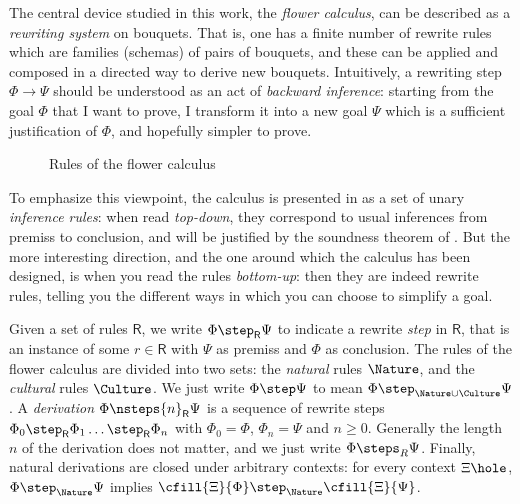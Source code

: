 The central device studied in this work, the \emph{flower calculus}, can be
described as a \emph{rewriting system} on bouquets. That is, one has a finite
number of rewrite rules which are families (schemas) of pairs of bouquets, and
these can be applied and composed in a directed way to derive new bouquets.
Intuitively, a rewriting step $\Phi \rightarrow \Psi$ should be understood as an
act of \emph{backward inference}: starting from the goal $\Phi$ that I want to
prove, I transform it into a new goal $\Psi$ which is a sufficient justification
of $\Phi$, and hopefully simpler to prove.

\begin{figure*}
  
  \caption{Rules of the flower calculus}
\end{figure*}


To emphasize this viewpoint, the calculus is presented in
 as a set of unary \emph{inference rules}: when read
\emph{top-down}, they correspond to usual inferences from premiss to conclusion,
and will be justified by the soundness theorem of .
But the more interesting direction, and the one around which the calculus has
been designed, is when you read the rules \emph{bottom-up}: then they are indeed
rewrite rules, telling you the different ways in which you can choose to
simplify a goal.


\begin{definition}[Derivation]
  Given a set of rules $\mathsf{R}$, we write $\Phi \step_{\mathsf{R}} \Psi$ to
  indicate a rewrite \emph{step} in $\mathsf{R}$, that is an instance of some
  $r \in \mathsf{R}$ with $\Psi$ as premiss and $\Phi$ as conclusion.
  The rules of the flower calculus are divided into two sets: the \emph{natural}
  rules $\Nature$, and the \emph{cultural} rules $\Culture$. We just write $\Phi
  \step \Psi$ to mean $\Phi \step_{\Nature\cup\Culture} \Psi$. A
  \emph{derivation} $\Phi \nsteps{n}_{\mathsf{R}} \Psi$ is a sequence of rewrite
  steps $\Phi_0 \step_{\mathsf{R}} \Phi_1 \ldots \step_{\mathsf{R}} \Phi_n$ with
  $\Phi_0 = \Phi$, $\Phi_n = \Psi$ and $n \geq 0$. Generally the length $n$ of
  the derivation does not matter, and we just write $\Phi \steps_R \Psi$.
  Finally, natural derivations are closed under arbitrary contexts: for every
  context $\Xi\hole$, $\Phi \step_\Nature \Psi$ implies $\cfill{\Xi}{\Phi}
  \step_\Nature \cfill{\Xi}{\Psi}$.
\end{definition}

